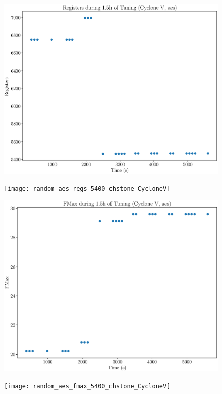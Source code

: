 \documentclass[12pt, a4paper]{article}
\begin{document}
\begin{figure}[htpb]
    \begin{minipage}{.48\textwidth}
        \includegraphics[scale=.25]{aes_regs_5400_chstone_CycloneV}
    \end{minipage}%
    \hfill
    \begin{minipage}{.48\textwidth}
        \texttt{[image: random\_aes\_regs\_5400\_chstone\_CycloneV]}
    \end{minipage}%

    \begin{minipage}{.48\textwidth}
        \includegraphics[scale=.25]{aes_fmax_5400_chstone_CycloneV}
    \end{minipage}%
    \hfill
    \begin{minipage}{.48\textwidth}
        \texttt{[image: random\_aes\_fmax\_5400\_chstone\_CycloneV]}
    \end{minipage}%
\end{figure}
\end{document}
